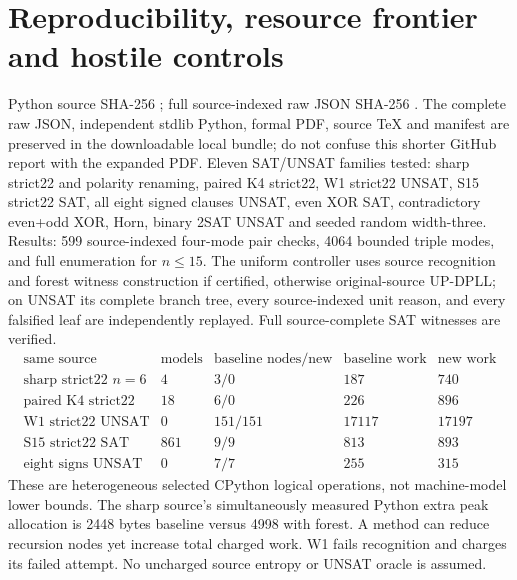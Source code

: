 \documentclass[10pt]{article}
\begin{document}
\section{Reproducibility, resource frontier and hostile controls}
Python source SHA-256 ; full source-indexed raw JSON SHA-256 . The complete raw JSON, independent stdlib Python, formal PDF, source TeX and manifest are preserved in the downloadable local bundle; do not confuse this shorter GitHub report with the expanded PDF. Eleven SAT/UNSAT families tested: sharp strict22 and polarity renaming, paired K4 strict22, W1 strict22 UNSAT, S15 strict22 SAT, all eight signed clauses UNSAT, even XOR SAT, contradictory even+odd XOR, Horn, binary 2SAT UNSAT and seeded random width-three. Results: 599 source-indexed four-mode pair checks, 4064 bounded triple modes, and full enumeration for $n\le15$. The uniform controller uses source recognition and forest witness construction if certified, otherwise original-source UP-DPLL; on UNSAT its complete branch tree, every source-indexed unit reason, and every falsified leaf are independently replayed. Full source-complete SAT witnesses are verified.
\[
\begin{array}{lrrrr}
\text{same source}&\text{models}&\text{baseline nodes/new}&\text{baseline work}&\text{new work}\\
\text{sharp strict22 $n=6$}&4&3/0&187&740\\
\text{paired K4 strict22}&18&6/0&226&896\\
\text{W1 strict22 UNSAT}&0&151/151&17117&17197\\
\text{S15 strict22 SAT}&861&9/9&813&893\\
\text{eight signs UNSAT}&0&7/7&255&315
\end{array}
\]
These are heterogeneous selected CPython logical operations, not machine-model lower bounds. The sharp source's simultaneously measured Python extra peak allocation is 2448 bytes baseline versus 4998 with forest. A method can reduce recursion nodes yet increase total charged work. W1 fails recognition and charges its failed attempt. No uncharged source entropy or UNSAT oracle is assumed.
\end{document}
